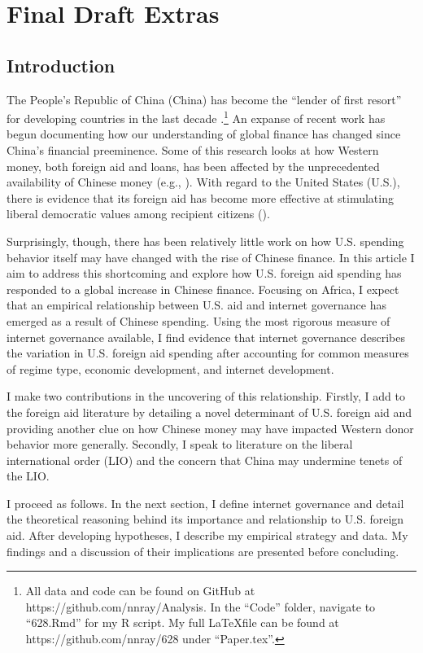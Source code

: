 \section{Final Draft Extras}
\subsection{Introduction}
The People's Republic of China (China) has become the ``lender of first resort'' for developing countries in the last decade \parencite[1]{dreher2022}.\footnote{All data and code can be found on GitHub at https://github.com/nnray/Analysis. In the ``Code'' folder, navigate to ``628.Rmd'' for my R script. My full \LaTeX \;file can be found at https://github.com/nnray/628 under ``Paper.tex''.} An expanse of recent work has begun documenting how our understanding of global finance has changed since China's financial preeminence. Some of this research looks at how Western money, both foreign aid and loans, has been affected by the unprecedented availability of Chinese money (e.g., \cite{hernandez2017}). With regard to the United States (U.S.), there is evidence that its foreign aid has become more effective at stimulating liberal democratic values among recipient citizens (\cite{blair2022}). %

Surprisingly, though, there has been relatively little work on how U.S. spending behavior itself may have changed with the rise of Chinese finance. In this article I aim to address this shortcoming and explore how U.S. foreign aid spending has responded to a global increase in Chinese finance. Focusing on Africa, I expect that an empirical relationship between U.S. aid and internet governance has emerged as a result of Chinese spending. Using the most rigorous measure of internet governance available, I find evidence that internet governance describes the variation in U.S. foreign aid spending after accounting for common measures of regime type, economic development, and internet development.

I make two contributions in the uncovering of this relationship. Firstly, I add to the foreign aid literature by detailing a novel determinant of U.S. foreign aid and providing another clue on how Chinese money may have impacted Western donor behavior more generally. Secondly, I speak to literature on the liberal international order (LIO) and the concern that China may undermine tenets of the LIO. %

I proceed as follows. In the next section, I define internet governance and detail the theoretical reasoning behind its importance and relationship to U.S. foreign aid. After developing hypotheses, I describe my empirical strategy and data. My findings and a discussion of their implications are presented before concluding.


